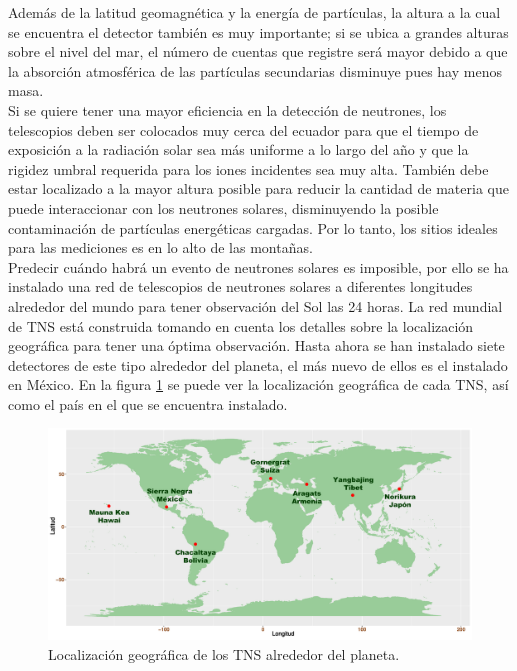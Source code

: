 Además de la latitud geomagnética y la energía de partículas, la altura a la cual se encuentra el detector también es muy importante; si se ubica a grandes alturas sobre el nivel del mar, el número de cuentas que registre será mayor debido a que la absorción atmosférica de las partículas secundarias disminuye pues hay menos masa\cite{chismes}.\\

Si se quiere tener una mayor eficiencia en la detección de neutrones, los telescopios deben ser colocados muy cerca del ecuador para que el tiempo de exposición a la radiación solar sea más uniforme a lo largo del año y que la rigidez umbral requerida para los iones incidentes sea muy alta. También debe estar localizado a la mayor altura posible para reducir la cantidad de materia que puede interaccionar con los neutrones solares, disminuyendo la posible contaminación de partículas energéticas cargadas. Por lo tanto, los sitios ideales para las mediciones es en lo alto de las montañas.\\

Predecir cuándo habrá un evento de neutrones solares es imposible, por ello se ha instalado una red de telescopios de neutrones solares a diferentes longitudes alrededor del mundo para tener observación del Sol las 24 horas. La red mundial de TNS está construida tomando en cuenta los detalles sobre la localización geográfica para tener una óptima observación. Hasta ahora se han instalado siete detectores de este tipo alrededor del planeta, el más nuevo de ellos es el instalado en México. En la figura \ref{red} se puede ver la localización geográfica de cada TNS, así como el país en el que se encuentra instalado.\\


\begin{figure}[H]
  \centering
    \includegraphics[scale=0.43]{Capitulo2/figs/mapatns.pdf}      %
  \caption{Localización geográfica de los TNS alrededor del planeta.}            %
  \label{red}                            %
\end{figure}


